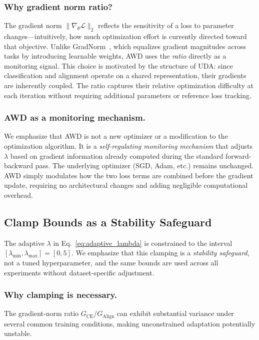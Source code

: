 \documentclass[pdflatex,sn-mathphys-num]{sn-jnl}
\theoremstyle{thmstyleone}
\theoremstyle{thmstyletwo}
\theoremstyle{thmstylethree}
\begin{document}
\subsubsection{Why gradient norm ratio?}
The gradient norm $\|\nabla_\theta \mathcal{L}\|_2$ reflects the sensitivity of a loss to parameter changes---intuitively, how much optimization effort is currently directed toward that objective. Unlike GradNorm~\cite{chen2018gradnorm}, which equalizes gradient magnitudes across tasks by introducing learnable weights, AWD uses the \emph{ratio} directly as a monitoring signal. This choice is motivated by the structure of UDA: since classification and alignment operate on a shared representation, their gradients are inherently coupled. The ratio captures their relative optimization difficulty at each iteration without requiring additional parameters or reference loss tracking.

\subsubsection{AWD as a monitoring mechanism.}
We emphasize that AWD is not a new optimizer or a modification to the optimization algorithm. It is a \emph{self-regulating monitoring mechanism} that adjusts $\lambda$ based on gradient information already computed during the standard forward-backward pass. The underlying optimizer (SGD, Adam, etc.) remains unchanged. AWD simply modulates how the two loss terms are combined before the gradient update, requiring no architectural changes and adding negligible computational overhead.

\subsection{Clamp Bounds as a Stability Safeguard}
\label{sec:clamp_justification}

The adaptive $\lambda$ in Eq.~\eqref{eq:adaptive_lambda} is constrained to the interval $[\lambda_{\min}, \lambda_{\max}] = [0, 5]$. We emphasize that this clamping is a \emph{stability safeguard}, not a tuned hyperparameter, and the same bounds are used across all experiments without dataset-specific adjustment.

\subsubsection{Why clamping is necessary.}

The gradient-norm ratio $G_{\text{CE}} / G_{\text{Align}}$ can exhibit substantial variance under several common training conditions, making unconstrained adaptation potentially unstable.
\end{document}
